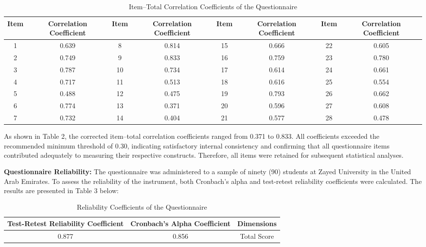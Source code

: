 \documentclass[10pt]{NSP1}
\begin{document}
	\setcounter{table}{1}
	\begin{table}[H]
		\centering
		\caption{Item–Total Correlation Coefficients of the Questionnaire}
		\small
		\renewcommand{\arraystretch}{1.2}
		\begin{tabular}{|c|c|c|c|c|c|c|c|}
			\hline
			\textbf{Item} & \textbf{Correlation Coefficient} & \textbf{Item} & \textbf{Correlation Coefficient} & \textbf{Item} & \textbf{Correlation Coefficient} & \textbf{Item} & \textbf{Correlation Coefficient} \\
			\hline
			1  & 0.639 & 8  & 0.814 & 15 & 0.666 & 22 & 0.605 \\
			2  & 0.749 & 9  & 0.833 & 16 & 0.759 & 23 & 0.780 \\
			3  & 0.787 & 10 & 0.734 & 17 & 0.614 & 24 & 0.661 \\
			4  & 0.717 & 11 & 0.513 & 18 & 0.616 & 25 & 0.554 \\
			5  & 0.488 & 12 & 0.475 & 19 & 0.793 & 26 & 0.662 \\
			6  & 0.774 & 13 & 0.371 & 20 & 0.596 & 27 & 0.608 \\
			7  & 0.732 & 14 & 0.404 & 21 & 0.577 & 28 & 0.478 \\
			\hline
		\end{tabular}
	\end{table}
	
	As shown in Table 2, the corrected item–total correlation coefficients ranged from 0.371 to 0.833. All coefficients exceeded the recommended minimum threshold of 0.30, indicating satisfactory internal consistency and confirming that all questionnaire items contributed adequately to measuring their respective constructs. Therefore, all items were retained for subsequent statistical analyses.
	
	\noindent\textbf{Questionnaire Reliability:} The questionnaire was administered to a sample of ninety (90) students at Zayed University in the United Arab Emirates. To assess the reliability of the instrument, both Cronbach's alpha and test-retest reliability coefficients were calculated. The results are presented in Table 3 below:
	
	\setcounter{table}{2}
	\begin{table}[H]
		\centering
		\caption{Reliability Coefficients of the Questionnaire}
		\small
		\renewcommand{\arraystretch}{1.5}
		\begin{tabular}{|c|c|c|}
			\hline
			\textbf{Test-Retest Reliability Coefficient} & \textbf{Cronbach's Alpha Coefficient} & \textbf{Dimensions} \\
			\hline
			0.877 & 0.856 & Total Score \\
			\hline
		\end{tabular}
	\end{table}
	
\end{document}
